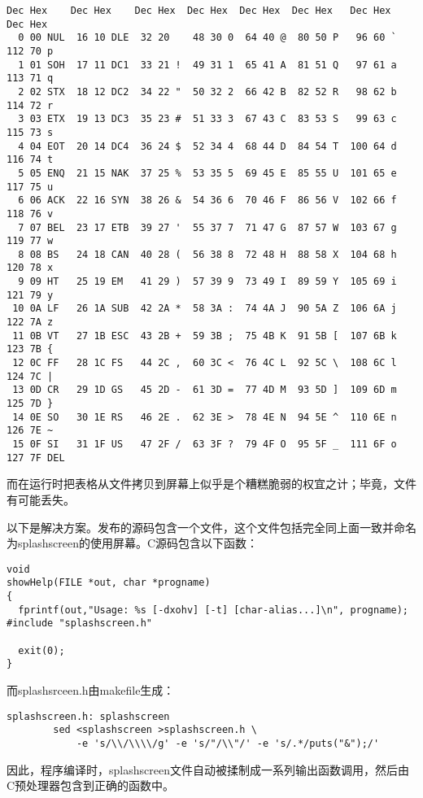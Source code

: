 \documentclass[12pt,oneside]{ctexbook}
\begin{document}
\begin{common-format}
\begin{Verbatim}[label=例9.5 ascii用法屏幕]
Dec Hex    Dec Hex    Dec Hex  Dec Hex  Dec Hex  Dec Hex   Dec Hex   Dec Hex
  0 00 NUL  16 10 DLE  32 20    48 30 0  64 40 @  80 50 P   96 60 `  112 70 p
  1 01 SOH  17 11 DC1  33 21 !  49 31 1  65 41 A  81 51 Q   97 61 a  113 71 q
  2 02 STX  18 12 DC2  34 22 "  50 32 2  66 42 B  82 52 R   98 62 b  114 72 r
  3 03 ETX  19 13 DC3  35 23 #  51 33 3  67 43 C  83 53 S   99 63 c  115 73 s
  4 04 EOT  20 14 DC4  36 24 $  52 34 4  68 44 D  84 54 T  100 64 d  116 74 t
  5 05 ENQ  21 15 NAK  37 25 %  53 35 5  69 45 E  85 55 U  101 65 e  117 75 u
  6 06 ACK  22 16 SYN  38 26 &  54 36 6  70 46 F  86 56 V  102 66 f  118 76 v
  7 07 BEL  23 17 ETB  39 27 '  55 37 7  71 47 G  87 57 W  103 67 g  119 77 w
  8 08 BS   24 18 CAN  40 28 (  56 38 8  72 48 H  88 58 X  104 68 h  120 78 x
  9 09 HT   25 19 EM   41 29 )  57 39 9  73 49 I  89 59 Y  105 69 i  121 79 y
 10 0A LF   26 1A SUB  42 2A *  58 3A :  74 4A J  90 5A Z  106 6A j  122 7A z
 11 0B VT   27 1B ESC  43 2B +  59 3B ;  75 4B K  91 5B [  107 6B k  123 7B {
 12 0C FF   28 1C FS   44 2C ,  60 3C <  76 4C L  92 5C \  108 6C l  124 7C |
 13 0D CR   29 1D GS   45 2D -  61 3D =  77 4D M  93 5D ]  109 6D m  125 7D }
 14 0E SO   30 1E RS   46 2E .  62 3E >  78 4E N  94 5E ^  110 6E n  126 7E ~
 15 0F SI   31 1F US   47 2F /  63 3F ?  79 4F O  95 5F _  111 6F o  127 7F DEL
\end{Verbatim}

而在运行时把表格从文件拷贝到屏幕上似乎是个糟糕脆弱的权宜之计；毕竟，文件有可能丢失。

以下是解决方案。发布的源码包含一个文件，这个文件包括完全同上面一致并命名为splashscreen的使用屏幕。C源码包含以下函数：

\begin{Verbatim}
void
showHelp(FILE *out, char *progname)
{
  fprintf(out,"Usage: %s [-dxohv] [-t] [char-alias...]\n", progname);
#include "splashscreen.h"

  exit(0);
}
\end{Verbatim}

而splashsrceen.h由makefile生成：

\begin{Verbatim}
splashscreen.h: splashscreen
        sed <splashscreen >splashscreen.h \
            -e 's/\\/\\\\/g' -e 's/"/\\"/' -e 's/.*/puts("&");/'
\end{Verbatim}

因此，程序编译时，splashscreen文件自动被揉制成一系列输出函数调用，然后由C预处理器包含到正确的函数中。


\end{common-format}
\end{document}
